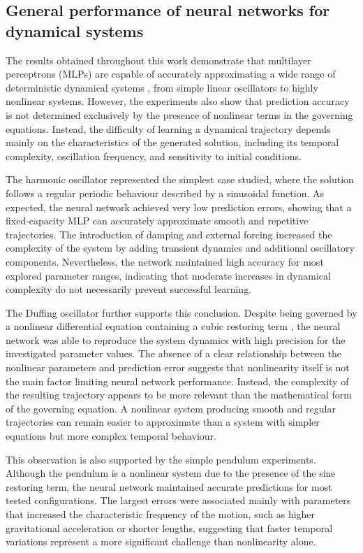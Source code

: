 \subsection{General performance of neural networks for dynamical systems}
The results obtained throughout this work demonstrate that multilayer perceptrons (MLPs) are capable of accurately approximating a wide range of deterministic dynamical systems \cite{lagaris1998artificial, brunton2020machine}, from simple linear oscillators to highly nonlinear systems. However, the experiments also show that prediction accuracy is not determined exclusively by the presence of nonlinear terms in the governing equations. Instead, the difficulty of learning a dynamical trajectory depends mainly on the characteristics of the generated solution, including its temporal complexity, oscillation frequency, and sensitivity to initial conditions.

The harmonic oscillator represented the simplest case studied, where the solution follows a regular periodic behaviour described by a sinusoidal function. As expected, the neural network achieved very low prediction errors, showing that a fixed-capacity MLP can accurately approximate smooth and repetitive trajectories. The introduction of damping and external forcing increased the complexity of the system by adding transient dynamics and additional oscillatory components. Nevertheless, the network maintained high accuracy for most explored parameter ranges, indicating that moderate increases in dynamical complexity do not necessarily prevent successful learning.

The Duffing oscillator further supports this conclusion. Despite being governed by a nonlinear differential equation containing a cubic restoring term \cite{strogatz2015nonlinear}, the neural network was able to reproduce the system dynamics with high precision for the investigated parameter values. The absence of a clear relationship between the nonlinear parameters and prediction error suggests that nonlinearity itself is not the main factor limiting neural network performance. Instead, the complexity of the resulting trajectory appears to be more relevant than the mathematical form of the governing equation. A nonlinear system producing smooth and regular trajectories can remain easier to approximate than a system with simpler equations but more complex temporal behaviour.

This observation is also supported by the simple pendulum experiments. Although the pendulum is a nonlinear system due to the presence of the sine restoring term, the neural network maintained accurate predictions for most tested configurations. The largest errors were associated mainly with parameters that increased the characteristic frequency of the motion, such as higher gravitational acceleration or shorter lengths, suggesting that faster temporal variations represent a more significant challenge than nonlinearity alone.

